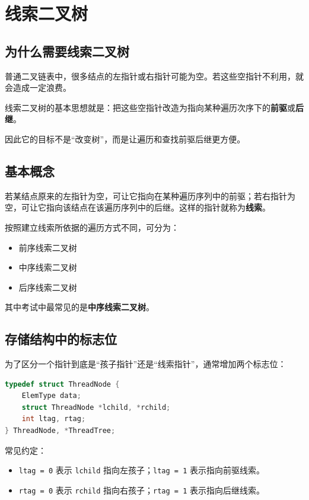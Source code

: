 \documentclass{../../note}
\begin{document}
\section{线索二叉树}

\subsection{为什么需要线索二叉树}

普通二叉链表中，很多结点的左指针或右指针可能为空。若这些空指针不利用，就会造成一定浪费。

线索二叉树的基本思想就是：把这些空指针改造为指向某种遍历次序下的\textbf{前驱}或\textbf{后继}。

因此它的目标不是“改变树”，而是让遍历和查找前驱后继更方便。

\subsection{基本概念}

若某结点原来的左指针为空，可让它指向在某种遍历序列中的前驱；若右指针为空，可让它指向该结点在该遍历序列中的后继。这样的指针就称为\textbf{线索}。

按照建立线索所依据的遍历方式不同，可分为：

\begin{itemize}
  \item 前序线索二叉树
  \item 中序线索二叉树
  \item 后序线索二叉树
\end{itemize}

其中考试中最常见的是\textbf{中序线索二叉树}。

\subsection{存储结构中的标志位}

为了区分一个指针到底是“孩子指针”还是“线索指针”，通常增加两个标志位：

\begin{lstlisting}[language=C]
typedef struct ThreadNode {
    ElemType data;
    struct ThreadNode *lchild, *rchild;
    int ltag, rtag;
} ThreadNode, *ThreadTree;
\end{lstlisting}

常见约定：

\begin{itemize}
  \item \texttt{ltag = 0} 表示 \texttt{lchild} 指向左孩子；\texttt{ltag = 1} 表示指向前驱线索。
  \item \texttt{rtag = 0} 表示 \texttt{rchild} 指向右孩子；\texttt{rtag = 1} 表示指向后继线索。
\end{itemize}
\end{document}
